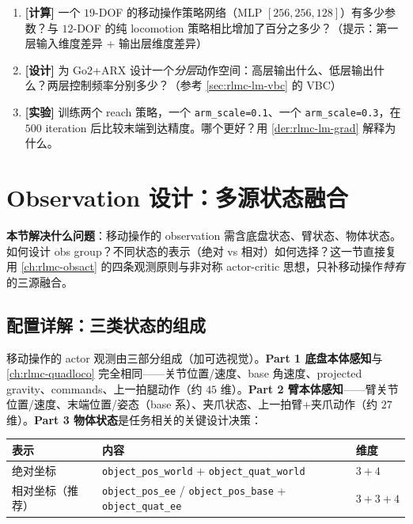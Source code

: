 \begin{practice}[练习·混合动作空间]
\begin{enumerate}
\item \textbf{[计算]} 一个 $19$-DOF 的移动操作策略网络（MLP $[256,256,128]$）有多少参数？与 $12$-DOF 的纯 locomotion 策略相比增加了百分之多少？（提示：第一层输入维度差异 + 输出层维度差异）
\item \textbf{[设计]} 为 Go2+ARX 设计一个\emph{分层}动作空间：高层输出什么、低层输出什么？两层控制频率分别多少？（参考 \cref{sec:rlmc-lm-vbc} 的 VBC）
\item \textbf{[实验]} 训练两个 reach 策略，一个 \verb|arm_scale=0.1|、一个 \verb|arm_scale=0.3|，在 $500$ iteration 后比较末端到达精度。哪个更好？用 \cref{der:rlmc-lm-grad} 解释为什么。
\end{enumerate}
\end{practice}

\section{Observation 设计：多源状态融合}
\label{sec:rlmc-lm-obs}

\textbf{本节解决什么问题}：移动操作的 observation 需含底盘状态、臂状态、物体状态。如何设计 obs group？不同状态的表示（绝对 vs 相对）如何选择？这一节直接复用 \cref{ch:rlmc-obsact} 的四条观测原则与非对称 actor-critic 思想，只补移动操作\emph{特有}的三源融合。

\subsection{配置详解：三类状态的组成}
\label{sec:rlmc-lm-obs-three}

移动操作的 actor 观测由三部分组成（加可选视觉）。\textbf{Part 1 底盘本体感知}与 \cref{ch:rlmc-quadloco} 完全相同——关节位置/速度、base 角速度、projected gravity、commands、上一拍腿动作（约 $45$ 维）。\textbf{Part 2 臂本体感知}——臂关节位置/速度、末端位置/姿态（base 系）、夹爪状态、上一拍臂+夹爪动作（约 $27$ 维）。\textbf{Part 3 物体状态}是任务相关的关键设计决策：

\begin{center}
\small
\begin{tabular}{@{}lll@{}}
\toprule
表示 & 内容 & 维度 \\
\midrule
绝对坐标 & \texttt{object\_pos\_world} + \texttt{object\_quat\_world} & $3+4$ \\
相对坐标（推荐） & \texttt{object\_pos\_ee} / \texttt{object\_pos\_base} + \texttt{object\_quat\_ee} & $3+3+4$ \\
\bottomrule
\end{tabular}
\end{center}

